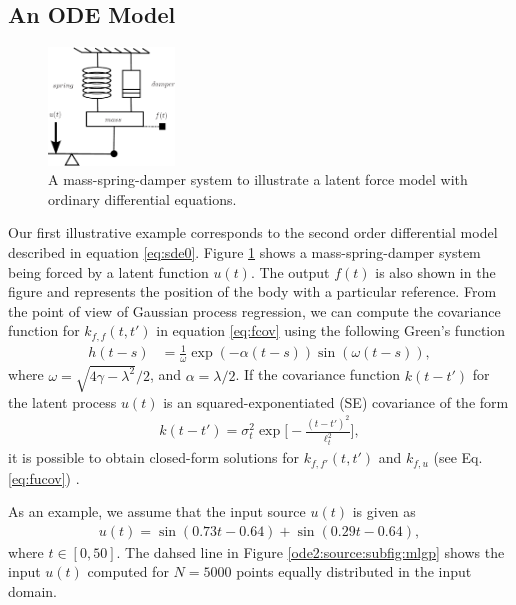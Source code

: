 \documentclass[journal]{IEEEtran}
\newcommand{\simo}[1]{{\color{red}#1}}
\begin{document}
\subsection{An ODE Model}
%
\begin{figure}[!t]
\centering
\includegraphics[width=0.3\textwidth]{massSpringDamper}
\caption{A mass-spring-damper system to illustrate a latent force model with ordinary differential equations.}
\label{mass:spring:damper:figure}
\end{figure}
Our first illustrative example corresponds to the second order
differential model described in equation \eqref{eq:sde0}. Figure
\ref{mass:spring:damper:figure} shows a mass-spring-damper system
being forced by a latent function $u(t)$. The output $f(t)$ is also
shown in the figure and represents the position of the body with a
particular reference. From the point of view of Gaussian process
regression, we can compute the covariance function for $k_{f,f}(t,t')$
in equation \eqref{eq:fcov} using the following Green's function 
\begin{align}\label{Greens:ODE:2}
h(t-s) & = \frac{1}{\omega}\exp(-\alpha(t-s))\sin(\omega(t-s)),
\end{align} 
where $\omega = \sqrt{4\gamma - \lambda^2}/2$, and $\alpha =
\lambda/2$. 
If the covariance function $k(t-t')$ for the latent process $u(t)$  is an
squared-exponentiated (SE) covariance of the form 
\begin{align*}
k(t -t') = \sigma_t^2\exp\Bigg[-\frac{(t-t')^2}{\ell^2_t}\Bigg],
\end{align*}
it is possible to obtain closed-form solutions for $k_{f,f'}(t,t')$
and $k_{f,u}$ (see Eq. \eqref{eq:fucov})
\cite{Alvarez+Luengo+Lawrence:2009}.
 
As an example, we assume that the input source $u(t)$ is given as
\begin{align*}
u(t) = \sin(0.73t - 0.64) + \sin(0.29t- 0.64),
\end{align*}
where $t\in [0,50]$. The dahsed line in Figure \ref{ode2:source:subfig:mlgp}  shows the input $u(t)$ computed for
$N=5000$ points equally distributed in the input domain. 
\end{document}
